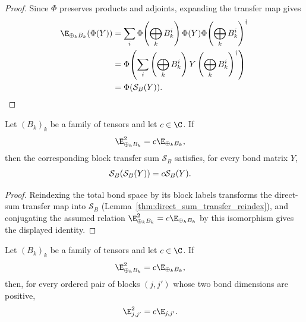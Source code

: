 \begin{proof}\leanok
    Since $\Phi$ preserves products and adjoints, expanding the transfer map
    gives
    \begin{align}
        \E_{\oplus_k B_k}(\Phi(Y))
         & =\sum_i\Phi\!\left(\bigoplus_k B_k^i\right)\Phi(Y)
        \Phi\!\left(\bigoplus_k B_k^i\right)^\dagger
        \notag                                                \\
         & =\Phi\!\left(\sum_i
        \left(\bigoplus_k B_k^i\right)Y
        \left(\bigoplus_k B_k^i\right)^\dagger\right)
        \notag                                                \\
         & =\Phi(\mathcal S_B(Y)).
        \notag
    \end{align}
\end{proof}

\begin{lemma}%
    \label{thm:block_transfer_sum_quasi_idempotent_of_direct_sum}
    \leanok
    Let $(B_k)_k$ be a family of tensors and let $c\in\C$. If
    \begin{align}
        \E_{\oplus_k B_k}^2 & =c\E_{\oplus_k B_k},
        \notag
    \end{align}
    then the corresponding block transfer sum $\mathcal S_B$ satisfies, for
    every bond matrix $Y$,
    \begin{align}
        \mathcal S_B(\mathcal S_B(Y)) & =c\mathcal S_B(Y).
        \notag
    \end{align}
\end{lemma}

\begin{proof}\leanok
    Reindexing the total bond space by its block labels transforms the
    direct-sum transfer map into $\mathcal S_B$
    (Lemma~\ref{thm:direct_sum_transfer_reindex}), and conjugating the
    assumed relation $\E_{\oplus_k B_k}^2 = c\E_{\oplus_k B_k}$ by this
    isomorphism gives the displayed identity.
\end{proof}

\begin{lemma}%
    \label{thm:mixed_transfer_quasi_idempotent_of_direct_sum}
    \leanok
    Let $(B_k)_k$ be a family of tensors and let $c\in\C$. If
    \begin{align}
        \E_{\oplus_k B_k}^2 & =c\E_{\oplus_k B_k},
        \notag
    \end{align}
    then, for every ordered pair of blocks $(j,j')$ whose two bond dimensions
    are positive,
    \begin{align}
        \E_{j,j'}^2 & =c\E_{j,j'}.
        \notag
    \end{align}
\end{lemma}

